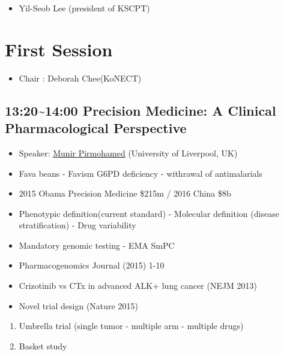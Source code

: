 \documentclass[]{book}
\providecommand{\tightlist}{%
  \setlength{\itemsep}{0pt}\setlength{\parskip}{0pt}}
\begin{document}
\begin{itemize}
\tightlist
\item
  Yil-Seob Lee (president of KSCPT)
\end{itemize}

\section{First Session}\label{first-session}

\begin{itemize}
\tightlist
\item
  Chair : Deborah Chee(KoNECT)
\end{itemize}

\subsection{13:20\textasciitilde{}14:00 Precision Medicine: A Clinical
Pharmacological
Perspective}\label{precision-medicine-a-clinical-pharmacological-perspective}

\begin{itemize}
\tightlist
\item
  Speaker: \href{https://en.wikipedia.org/wiki/Munir_Pirmohamed}{Munir
  Pirmohamed} (University of Liverpool, UK)
\item
  Fava beans - Favism G6PD deficiency - withrawal of antimalarials
\item
  2015 Obama Precision Medicine \$215m / 2016 China \$8b
\item
  Phenotypic definition(current standard) - Molecular definition
  (disease stratification) - Drug variability
\item
  Mandatory genomic testing - EMA SmPC
\item
  Pharmacogenomics Journal (2015) 1-10
\item
  Crizotinib vs CTx in advanced ALK+ lung cancer (NEJM 2013)
\item
  Novel trial design (Nature 2015)
\end{itemize}

\begin{enumerate}
\def\labelenumi{\arabic{enumi}.}
\tightlist
\item
  Umbrella trial (single tumor - multiple arm - multiple drugs)
\item
  Basket study
\end{enumerate}
\end{document}
